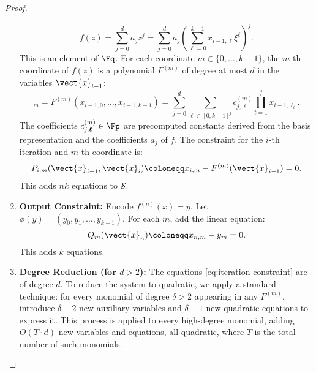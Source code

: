 \begin{proof}
\begin{enumerate}
\begin{equation}
                                f(z) = \sum_{j=0}^{d} a_j z^j = \sum_{j=0}^{d} a_j \left( \sum_{\ell=0}^{k-1} x_{i-1,\ell} \xi^{\ell} \right)^j.
                            \end{equation}
                            This is an element of $\Fq$. For each coordinate $m \in \{0, \ldots, k-1\}$, the $m$-th coordinate of $f(z)$ is a polynomial $F^{(m)}$ of degree at most $d$ in the variables $\vect{x}_{i-1}$:
                            \begin{equation}
                            [   \phi(f(z))]_m = F^{(m)}(x_{i-1,0}, \ldots, x_{i-1,k-1}) = \sum_{j=0}^{d} \sum_{\boldsymbol{\ell} \in [0, k-1]^j} c_{j, \boldsymbol{\ell}}^{(m)} \prod_{t=1}^{j} x_{i-1, \ell_t}.
                            \end{equation}
                            The coefficients $c_{j, \boldsymbol{\ell}}^{(m)} \in \Fp$ are precomputed constants derived from the basis representation and the coefficients $a_j$ of $f$. The constraint for the $i$-th iteration and $m$-th coordinate is:
                            \begin{equation}\label{eq:iteration-constraint}
                                P_{i,m}(\vect{x}_{i-1}, \vect{x}_i) \coloneqq x_{i,m} - F^{(m)}(\vect{x}_{i-1}) = 0.
                            \end{equation}
                            This adds $nk$ equations to $\mathcal{S}$.
                        \item \textbf{Output Constraint:} Encode $f^{(n)}(x) = y$. Let $\phi(y) = (y_0, y_1, \ldots, y_{k-1})$. For each $m$, add the linear equation:
                            \begin{equation}
                                Q_m(\vect{x}_n) \coloneqq x_{n,m} - y_m = 0.
                            \end{equation}
                            This adds $k$ equations.
                        \item \textbf{Degree Reduction (for $d > 2$):} The equations \eqref{eq:iteration-constraint} are of degree $d$. To reduce the system to quadratic, we apply a standard technique: for every monomial of degree $\delta > 2$ appearing in any $F^{(m)}$, introduce $\delta - 2$ new auxiliary variables and $\delta - 1$ new quadratic equations to express it. This process is applied to every high-degree monomial, adding $O(T \cdot d)$ new variables and equations, all quadratic, where $T$ is the total number of such monomials.
                    \end{enumerate}

\end{proof}

